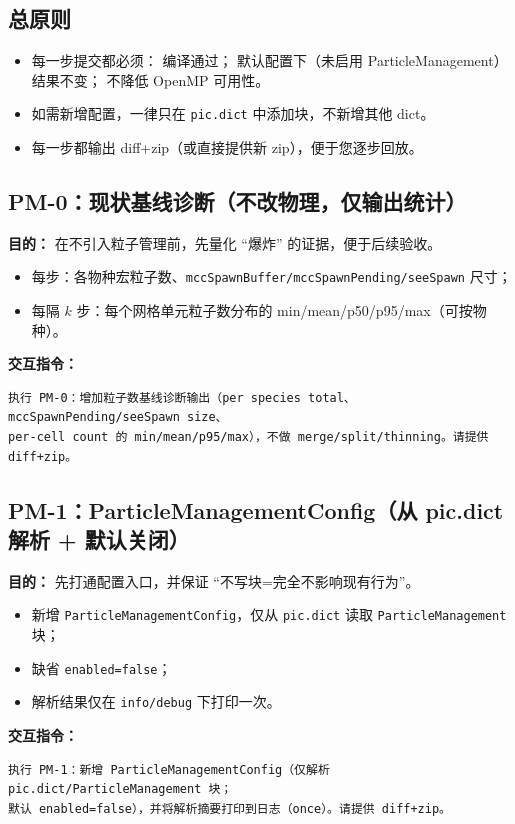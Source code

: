 \documentclass[UTF8,11pt,a4paper]{ctexart}
\begin{document}
\subsection*{总原则}
\begin{itemize}[itemsep=2pt]
  \item 每一步提交都必须： 编译通过； 默认配置下（未启用 ParticleManagement）结果不变； 不降低 OpenMP 可用性。
  \item 如需新增配置，一律只在 \texttt{pic.dict} 中添加块，不新增其他 dict。
  \item 每一步都输出 diff+zip（或直接提供新 zip），便于您逐步回放。
\end{itemize}

\subsection{PM-0：现状基线诊断（不改物理，仅输出统计）}
\textbf{目的：} 在不引入粒子管理前，先量化 ``爆炸'' 的证据，便于后续验收。
\begin{itemize}[itemsep=2pt]
  \item 每步：各物种宏粒子数、\texttt{mccSpawnBuffer/mccSpawnPending/seeSpawn} 尺寸；
  \item 每隔 $k$ 步：每个网格单元粒子数分布的 min/mean/p50/p95/max（可按物种）。
\end{itemize}
\textbf{交互指令：}
\begin{verbatim}
执行 PM-0：增加粒子数基线诊断输出（per species total、mccSpawnPending/seeSpawn size、
per-cell count 的 min/mean/p95/max），不做 merge/split/thinning。请提供 diff+zip。
\end{verbatim}

\subsection{PM-1：ParticleManagementConfig（从 pic.dict 解析 + 默认关闭）}
\textbf{目的：} 先打通配置入口，并保证 ``不写块=完全不影响现有行为''。
\begin{itemize}[itemsep=2pt]
  \item 新增 \texttt{ParticleManagementConfig}，仅从 \texttt{pic.dict} 读取 \texttt{ParticleManagement} 块；
  \item 缺省 \texttt{enabled=false}；
  \item 解析结果仅在 \texttt{info/debug} 下打印一次。
\end{itemize}
\textbf{交互指令：}
\begin{verbatim}
执行 PM-1：新增 ParticleManagementConfig（仅解析 pic.dict/ParticleManagement 块；
默认 enabled=false），并将解析摘要打印到日志（once）。请提供 diff+zip。
\end{verbatim}
\end{document}
